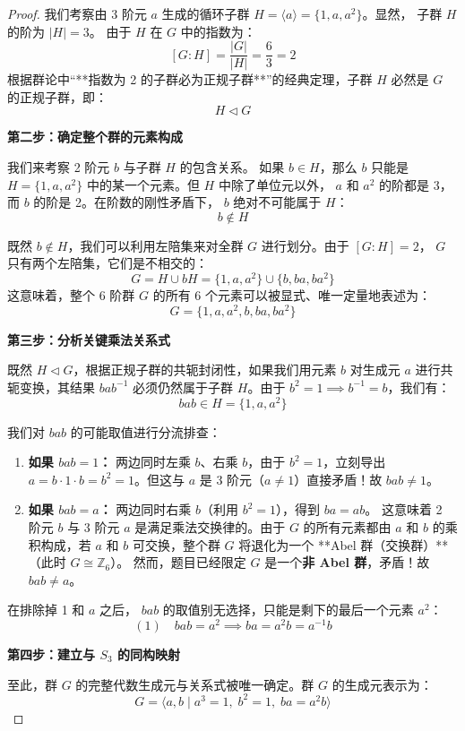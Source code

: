 \documentclass[]{article}
\begin{document}
\begin{proof}
我们考察由 3 阶元 $a$ 生成的循环子群 $H = \langle a \rangle = \{1, a, a^2\}$。显然， 子群 $H$ 的阶为 $|H| = 3$。
由于 $H$ 在 $G$ 中的指数为：
\[ [G : H] = \frac{|G|}{|H|} = \frac{6}{3} = 2 \]
根据群论中“**指数为 2 的子群必为正规子群**”的经典定理，子群 $H$ 必然是 $G$ 的正规子群，即：
\[ H \triangleleft G \]

\bigskip
\noindent \textbf{第二步：确定整个群的元素构成}

我们来考察 2 阶元 $b$ 与子群 $H$ 的包含关系。
如果 $b \in H$，那么 $b$ 只能是 $H = \{1, a, a^2\}$ 中的某一个元素。但 $H$ 中除了单位元以外， $a$ 和 $a^2$ 的阶都是 3，而 $b$ 的阶是 2。在阶数的刚性矛盾下， $b$ 绝对不可能属于 $H$：
\[ b \notin H \]

既然 $b \notin H$，我们可以利用左陪集来对全群 $G$ 进行划分。由于 $[G:H] = 2$， $G$ 只有两个左陪集，它们是不相交的：
\[ G = H \cup bH = \{1, a, a^2\} \cup \{b, ba, ba^2\} \]
这意味着，整个 6 阶群 $G$ 的所有 6 个元素可以被显式、唯一定量地表述为：
\[ G = \{1, a, a^2, b, ba, ba^2\} \]

\bigskip
\noindent \textbf{第三步：分析关键乘法关系式}

既然 $H \triangleleft G$，根据正规子群的共轭封闭性，如果我们用元素 $b$ 对生成元 $a$ 进行共轭变换，其结果 $b a b^{-1}$ 必须仍然属于子群 $H$。由于 $b^2 = 1 \implies b^{-1} = b$，我们有：
\[ b a b \in H = \{1, a, a^2\} \]

我们对 $b a b$ 的可能取值进行分流排查：
\begin{enumerate}
	\item \textbf{如果 $b a b = 1$：}
	两边同时左乘 $b$、右乘 $b$，由于 $b^2=1$，立刻导出 $a = b \cdot 1 \cdot b = b^2 = 1$。但这与 $a$ 是 3 阶元（$a \neq 1$）直接矛盾！故 $b a b \neq 1$。
	
	\item \textbf{如果 $b a b = a$：}
	两边同时右乘 $b$（利用 $b^2=1$），得到 $b a = a b$。
	这意味着 2 阶元 $b$ 与 3 阶元 $a$ 是满足乘法交换律的。由于 $G$ 的所有元素都由 $a$ 和 $b$ 的乘积构成，若 $a$ 和 $b$ 可交换，整个群 $G$ 将退化为一个 **Abel 群（交换群）**（此时 $G \cong \mathbb{Z}_6$）。
	然而，题目已经限定 $G$ 是一个\textbf{非 Abel 群}，矛盾！故 $b a b \neq a$。
\end{enumerate}

在排除掉 1 和 $a$ 之后， $b a b$ 的取值别无选择，只能是剩下的最后一个元素 $a^2$：
\[ (1) \quad b a b = a^2 \implies b a = a^2 b = a^{-1} b \]

\bigskip
\noindent \textbf{第四步：建立与 $S_3$ 的同构映射}

至此，群 $G$ 的完整代数生成元与关系式被唯一确定。群 $G$ 的生成元表示为：
\[ G = \langle a, b \mid a^3 = 1, \; b^2 = 1, \; ba = a^2b \rangle \]


\end{proof}
\end{document}
